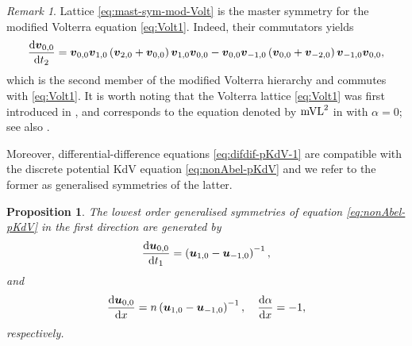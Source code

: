 \documentclass[dvips,10pt]{article}
\newcommand{\bs}{\boldsymbol}
\newtheorem{proposition}{Proposition}
\theoremstyle{remark} %
\newtheorem{remark}{Remark}
\begin{document}
	\begin{remark}
		Lattice \eqref{eq:mast-sym-mod-Volt} is the master symmetry for the modified Volterra equation \eqref{eq:Volt1}. Indeed, their commutators yields
		\begin{equation} \label{eq:Volt2}
			\frac{{\rm{d}} {\bs{v}}_{0,0}}{{\rm{d}} t_2} =   {\bs{v}}_{0,0} {\bs{v}}_{1,0} \left( {\bs{v}}_{2,0} + {\bs{v}}_{0,0}\right) {\bs{v}}_{1,0} {\bs{v}}_{0,0} -  {\bs{v}}_{0,0} {\bs{v}}_{-1,0} \left( {\bs{v}}_{0,0} + {\bs{v}}_{-2,0}\right) {\bs{v}}_{-1,0} {\bs{v}}_{0,0},
		\end{equation}
		which is the second member of the modified Volterra hierarchy and commutes with \eqref{eq:Volt1}. It is worth noting that the Volterra lattice \eqref{eq:Volt1} was first introduced in \cite{Bog}, and corresponds to the equation denoted by ${\rm mVL}^2$ in \cite{A1} with $\alpha = 0$; see also \cite{NW}.
	\end{remark}
	
	Moreover, differential-difference equations \eqref{eq:difdif-pKdV-1} are compatible with the discrete potential KdV equation \eqref{eq:nonAbel-pKdV} and we refer to the former as generalised symmetries of the latter. 
	
	\begin{proposition}
		The lowest order generalised symmetries of equation \eqref{eq:nonAbel-pKdV} in the first direction are generated by
		\begin{equation} \label{eq:sym1-pKdV}
			\frac{{\rm{d}} {\bs{u}}_{0,0}}{{\rm{d}} t_1} =  \left({\bs{u}}_{1,0}- {\bs{u}}_{-1,0}\right)^{-1},
		\end{equation}
		and
		\begin{equation} \label{eq:mast-sym-pKdV}
			\frac{{\rm{d}} {\bs{u}}_{0,0}}{{\rm{d}} x} =  n \left({\bs{u}}_{1,0}- {\bs{u}}_{-1,0}\right)^{-1}, ~~~ 	\frac{{\rm{d}} \alpha}{{\rm{d}} x} = -1,
		\end{equation}
		respectively.
	\end{proposition}
	
\end{document}
